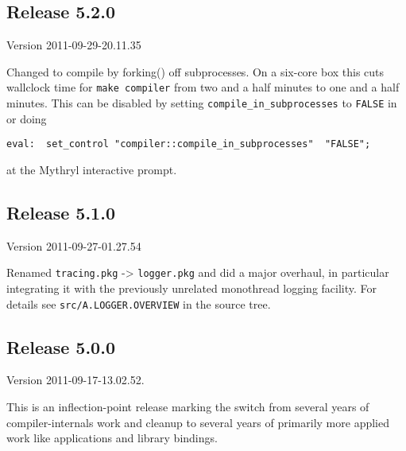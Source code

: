 \cutend*





\subsection{Release 5.2.0}
\label{section:src:release-5.2.0}

Version 2011-09-29-20.11.35

Changed to compile by forking() off subprocesses.  On a 
six-core box this cuts wallclock time for {\tt make compiler} 
from two and a half minutes to one and a half minutes.  This 
can be disabled by setting {\tt compile\_in\_subprocesses} to 
{\tt FALSE} in  
or doing 
\begin{verbatim}
eval:  set_control "compiler::compile_in_subprocesses" 	"FALSE";
\end{verbatim}
at the Mythryl interactive prompt. 

\cutend*




\subsection{Release 5.1.0}
\label{section:src:release-5.1.0}

Version 2011-09-27-01.27.54 

Renamed {\tt tracing.pkg} -> {\tt logger.pkg} and did a major 
overhaul, in particular integrating it with the previously 
unrelated monothread logging facility.  For details see 
{\tt src/A.LOGGER.OVERVIEW} in the source tree. 

\cutend*



\subsection{Release 5.0.0}
\label{section:src:release-5.0.0}

Version 2011-09-17-13.02.52.

This is an inflection-point release marking the switch from several 
years of compiler-internals work and cleanup to several years of 
primarily more applied work like applications and library bindings. 


